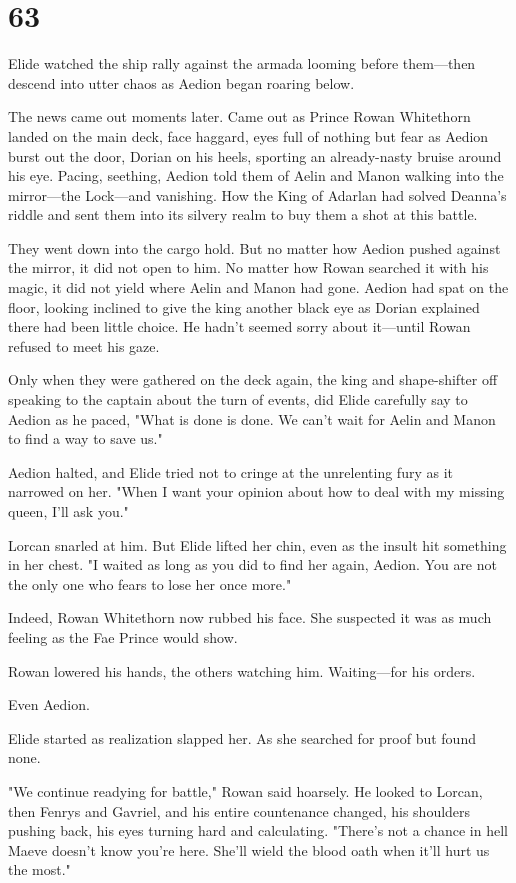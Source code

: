 
\chapter{63}

Elide watched the ship rally against the armada looming before them---then descend into utter chaos as Aedion began roaring below.

The news came out moments later. Came out as Prince Rowan Whitethorn landed on the main deck, face haggard, eyes full of nothing but fear as Aedion burst out the door, Dorian on his heels, sporting an already-nasty bruise around his eye. Pacing, seething, Aedion told them of Aelin and Manon walking into the mirror---the Lock---and vanishing. How the King of Adarlan had solved Deanna's riddle and sent them into its silvery realm to buy them a shot at this battle.

They went down into the cargo hold. But no matter how Aedion pushed against the mirror, it did not open to him. No matter how Rowan searched it with his magic, it did not yield where Aelin and Manon had gone. Aedion had spat on the floor, looking inclined to give the king another black eye as Dorian explained there had been little choice. He hadn't seemed sorry about it---until Rowan refused to meet his gaze.

Only when they were gathered on the deck again, the king and shape-shifter off speaking to the captain about the turn of events, did Elide carefully say to Aedion as he paced, "What is done is done. We can't wait for Aelin and Manon to find a way to save us."

Aedion halted, and Elide tried not to cringe at the unrelenting fury as it narrowed on her. "When I want your opinion about how to deal with my missing queen, I'll ask you."

Lorcan snarled at him. But Elide lifted her chin, even as the insult hit something in her chest. "I waited as long as you did to find her again, Aedion. You are not the only one who fears to lose her once more."

Indeed, Rowan Whitethorn now rubbed his face. She suspected it was as much feeling as the Fae Prince would show.

Rowan lowered his hands, the others watching him. Waiting---for his orders.

Even Aedion.

Elide started as realization slapped her. As she searched for proof but found none.

"We continue readying for battle," Rowan said hoarsely. He looked to Lorcan, then Fenrys and Gavriel, and his entire countenance changed, his shoulders pushing back, his eyes turning hard and calculating. "There's not a chance in hell Maeve doesn't know you're here. She'll wield the blood oath when it'll hurt us the most."


